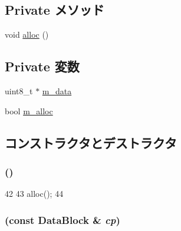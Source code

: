 \subsection*{Private メソッド}
\begin{DoxyCompactItemize}
\item 
void \hyperlink{classDataBlock_a84da126492aa15ed1e0a848026779237}{alloc} ()
\end{DoxyCompactItemize}
\subsection*{Private 変数}
\begin{DoxyCompactItemize}
\item 
uint8\_\-t $\ast$ \hyperlink{classDataBlock_a8b84eba161b544d25b6f99000ffaba8c}{m\_\-data}
\item 
bool \hyperlink{classDataBlock_a225f13db079994c51d6fc64651239d70}{m\_\-alloc}
\end{DoxyCompactItemize}


\subsection{コンストラクタとデストラクタ}
\hypertarget{classDataBlock_a70333aa76ea711881e05f285eb676414}{
\subsubsection[{DataBlock}]{ ()}}
\label{classDataBlock_a70333aa76ea711881e05f285eb676414}



\begin{DoxyCode}
42     {
43         alloc();
44     }
\end{DoxyCode}
\hypertarget{classDataBlock_a7d46edaeb847a8973610dc4d4ce6c6a2}{
\subsubsection[{DataBlock}]{ (const {\bf DataBlock} \& {\em cp})}}
\label{classDataBlock_a7d46edaeb847a8973610dc4d4ce6c6a2}



